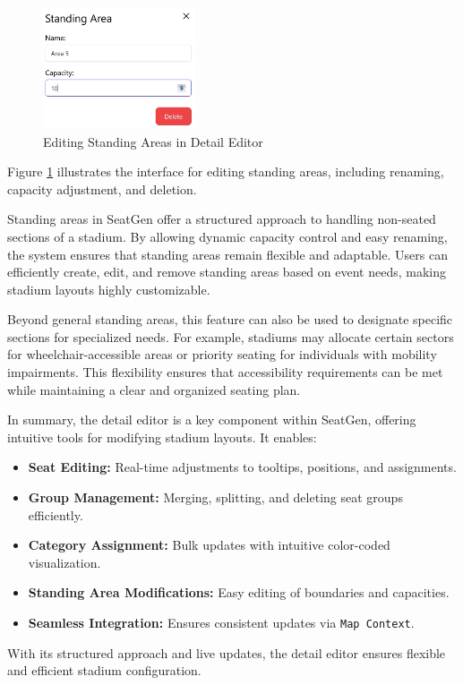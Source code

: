 \begin{figure}[H]
    \centering
    \includegraphics[width=0.4\textwidth]{pics/DetailEditorStandingArea.png}
    \caption{Editing Standing Areas in Detail Editor}
    \label{fig:detail-editor-standingarea}
\end{figure}

Figure \ref{fig:detail-editor-standingarea} illustrates the interface for editing standing areas, including renaming, capacity adjustment, and deletion.

Standing areas in SeatGen offer a structured approach to handling non-seated sections of a stadium. By allowing dynamic capacity control and easy renaming, the system ensures that standing areas remain flexible and adaptable. Users can efficiently create, edit, and remove standing areas based on event needs, making stadium layouts highly customizable.

Beyond general standing areas, this feature can also be used to designate specific sections for specialized needs. For example, stadiums may allocate certain sectors for wheelchair-accessible areas or priority seating for individuals with mobility impairments. This flexibility ensures that accessibility requirements can be met while maintaining a clear and organized seating plan.

In summary, the detail editor is a key component within SeatGen, offering intuitive tools for modifying stadium layouts. It enables:
\begin{itemize}
    \item \textbf{Seat Editing:} Real-time adjustments to tooltips, positions, and assignments.
    \item \textbf{Group Management:} Merging, splitting, and deleting seat groups efficiently.
    \item \textbf{Category Assignment:} Bulk updates with intuitive color-coded visualization.
    \item \textbf{Standing Area Modifications:} Easy editing of boundaries and capacities.
    \item \textbf{Seamless Integration:} Ensures consistent updates via \texttt{Map Context}.
\end{itemize}

With its structured approach and live updates, the detail editor ensures flexible and efficient stadium configuration.
